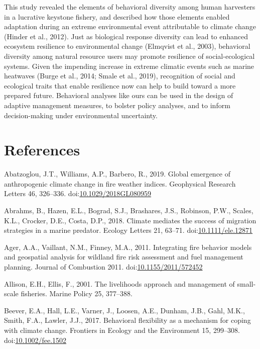 \documentclass[]{elsarticle} %
\begin{document}
This study revealed the elements of behavioral diversity among human
harvesters in a lucrative keystone fishery, and described how those
elements enabled adaptation during an extreme environmental event
attributable to climate change (Hinder et al., 2012). Just as biological
response diversity can lead to enhanced ecosystem resilience to
environmental change (Elmqvist et al., 2003), behavioral diversity among
natural resource users may promote resilience of social-ecological
systems. Given the impending increase in extreme climatic events such as
marine heatwaves (Burge et al., 2014; Smale et al., 2019), recognition
of social and ecological traits that enable resilience now can help to
build toward a more prepared future. Behavioral analyses like ours can
be used in the design of adaptive management measures, to bolster policy
analyses, and to inform decision-making under environmental uncertainty.

\hypertarget{refs}{%
\section*{References}\label{refs}}

\hypertarget{refs}{}
\leavevmode\hypertarget{ref-Abatzoglou2019}{}%
Abatzoglou, J.T., Williams, A.P., Barbero, R., 2019. Global emergence of
anthropogenic climate change in fire weather indices. Geophysical
Research Letters 46, 326--336.
doi:\href{https://doi.org/10.1029/2018GL080959}{10.1029/2018GL080959}

\leavevmode\hypertarget{ref-Abrahms2018}{}%
Abrahms, B., Hazen, E.L., Bograd, S.J., Brashares, J.S., Robinson, P.W.,
Scales, K.L., Crocker, D.E., Costa, D.P., 2018. Climate mediates the
success of migration strategies in a marine predator. Ecology Letters
21, 63--71.
doi:\href{https://doi.org/10.1111/ele.12871}{10.1111/ele.12871}

\leavevmode\hypertarget{ref-Ager2011}{}%
Ager, A.A., Vaillant, N.M., Finney, M.A., 2011. Integrating fire
behavior models and geospatial analysis for wildland fire risk
assessment and fuel management planning. Journal of Combustion 2011.
doi:\href{https://doi.org/10.1155/2011/572452}{10.1155/2011/572452}

\leavevmode\hypertarget{ref-Ellis2001}{}%
Allison, E.H., Ellis, F., 2001. The livelihoods approach and management
of small-scale fisheries. Marine Policy 25, 377--388.

\leavevmode\hypertarget{ref-Beever2017}{}%
Beever, E.A., Hall, L.E., Varner, J., Loosen, A.E., Dunham, J.B., Gahl,
M.K., Smith, F.A., Lawler, J.J., 2017. Behavioral flexibility as a
mechanism for coping with climate change. Frontiers in Ecology and the
Environment 15, 299--308.
doi:\href{https://doi.org/10.1002/fee.1502}{10.1002/fee.1502}
\end{document}
